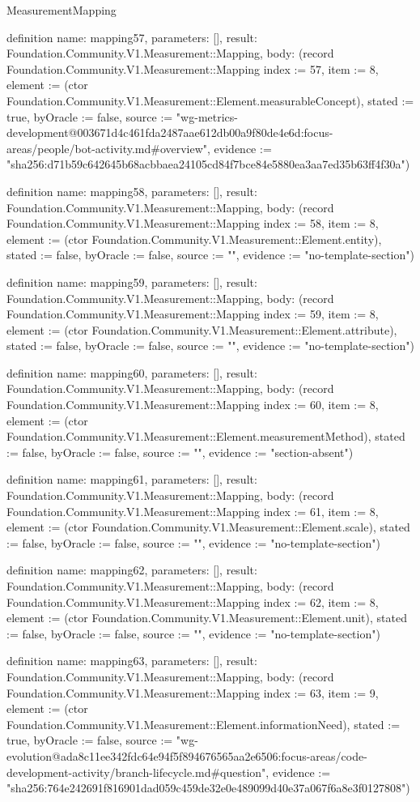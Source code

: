 \begin{lexlean}{MeasurementMapping}
\begin{semanticmodule}
definition{
  name: mapping57,
  parameters: [],
  result: Foundation.Community.V1.Measurement::Mapping,
  body: (record Foundation.Community.V1.Measurement::Mapping {index := 57, item := 8, element := (ctor Foundation.Community.V1.Measurement::Element.measurableConcept), stated := true, byOracle := false, source := "wg-metrics-development@003671d4c461fda2487aae612db00a9f80de4e6d:focus-areas/people/bot-activity.md#overview", evidence := "sha256:d71b59c642645b68acbbaea24105cd84f7bce84e5880ea3aa7ed35b63ff4f30a"})
}

definition{
  name: mapping58,
  parameters: [],
  result: Foundation.Community.V1.Measurement::Mapping,
  body: (record Foundation.Community.V1.Measurement::Mapping {index := 58, item := 8, element := (ctor Foundation.Community.V1.Measurement::Element.entity), stated := false, byOracle := false, source := "", evidence := "no-template-section"})
}

definition{
  name: mapping59,
  parameters: [],
  result: Foundation.Community.V1.Measurement::Mapping,
  body: (record Foundation.Community.V1.Measurement::Mapping {index := 59, item := 8, element := (ctor Foundation.Community.V1.Measurement::Element.attribute), stated := false, byOracle := false, source := "", evidence := "no-template-section"})
}

definition{
  name: mapping60,
  parameters: [],
  result: Foundation.Community.V1.Measurement::Mapping,
  body: (record Foundation.Community.V1.Measurement::Mapping {index := 60, item := 8, element := (ctor Foundation.Community.V1.Measurement::Element.measurementMethod), stated := false, byOracle := false, source := "", evidence := "section-absent"})
}

definition{
  name: mapping61,
  parameters: [],
  result: Foundation.Community.V1.Measurement::Mapping,
  body: (record Foundation.Community.V1.Measurement::Mapping {index := 61, item := 8, element := (ctor Foundation.Community.V1.Measurement::Element.scale), stated := false, byOracle := false, source := "", evidence := "no-template-section"})
}

definition{
  name: mapping62,
  parameters: [],
  result: Foundation.Community.V1.Measurement::Mapping,
  body: (record Foundation.Community.V1.Measurement::Mapping {index := 62, item := 8, element := (ctor Foundation.Community.V1.Measurement::Element.unit), stated := false, byOracle := false, source := "", evidence := "no-template-section"})
}

definition{
  name: mapping63,
  parameters: [],
  result: Foundation.Community.V1.Measurement::Mapping,
  body: (record Foundation.Community.V1.Measurement::Mapping {index := 63, item := 9, element := (ctor Foundation.Community.V1.Measurement::Element.informationNeed), stated := true, byOracle := false, source := "wg-evolution@ada8c11ee342fdc64e94f5f894676565aa2e6506:focus-areas/code-development-activity/branch-lifecycle.md#question", evidence := "sha256:764e242691f816901dad059c459de32e0e489099d40e37a067f6a8e3f0127808"})
}


\end{semanticmodule}
\end{lexlean}

